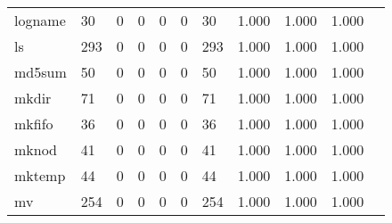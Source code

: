 \begin{longtable}{lp{1.10cm}p{1.10cm}p{1.10cm}p{1.10cm}p{1.10cm}p{1.10cm}p{1.10cm}p{1.10cm}p{1.10cm}p{1.10cm}}
logname   &                     30 &                                  0 &                                 0 &                                0 &                                 0 &                              30 &                          1.000 &                                 1.000 &                               1.000 \\
ls        &                    293 &                                  0 &                                 0 &                                0 &                                 0 &                             293 &                          1.000 &                                 1.000 &                               1.000 \\
md5sum    &                     50 &                                  0 &                                 0 &                                0 &                                 0 &                              50 &                          1.000 &                                 1.000 &                               1.000 \\
mkdir     &                     71 &                                  0 &                                 0 &                                0 &                                 0 &                              71 &                          1.000 &                                 1.000 &                               1.000 \\
mkfifo    &                     36 &                                  0 &                                 0 &                                0 &                                 0 &                              36 &                          1.000 &                                 1.000 &                               1.000 \\
mknod     &                     41 &                                  0 &                                 0 &                                0 &                                 0 &                              41 &                          1.000 &                                 1.000 &                               1.000 \\
mktemp    &                     44 &                                  0 &                                 0 &                                0 &                                 0 &                              44 &                          1.000 &                                 1.000 &                               1.000 \\
mv        &                    254 &                                  0 &                                 0 &                                0 &                                 0 &                             254 &                          1.000 &                                 1.000 &                               1.000 \\

\end{longtable}
